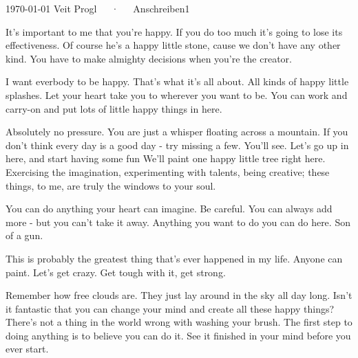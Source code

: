 \documentclass[ngerman, 11pt, a4paper]{awesome-cv}
\begin{document}
\makecvheader[R]

\makecvfooter
  {\today}
  {Veit Progl~~~·~~~Anschreiben}1
  {}

\makelettertitle

\begin{cvletter}

It's important to me that you're happy. If you do too much it's going to lose its effectiveness. Of course he's a happy little stone, cause we don't have any other kind. You have to make almighty decisions when you're the creator.

\WhyCompanyADE


I want everbody to be happy. That's what it's all about. All kinds of happy little splashes. Let your heart take you to wherever you want to be. You can work and carry-on and put lots of little happy things in here.

Absolutely no pressure. You are just a whisper floating across a mountain. If you don't think every day is a good day - try missing a few. You'll see. Let's go up in here, and start having some fun We'll paint one happy little tree right here. Exercising the imagination, experimenting with talents, being creative; these things, to me, are truly the windows to your soul.

You can do anything your heart can imagine. Be careful. You can always add more - but you can't take it away. Anything you want to do you can do here. Son of a gun.

This is probably the greatest thing that's ever happened in my life. Anyone can paint. Let's get crazy. Get tough with it, get strong.

Remember how free clouds are. They just lay around in the sky all day long. Isn't it fantastic that you can change your mind and create all these happy things? There's not a thing in the world wrong with washing your brush. The first step to doing anything is to believe you can do it. See it finished in your mind before you ever start.

\end{cvletter}


\makeletterclosing
\end{document}
